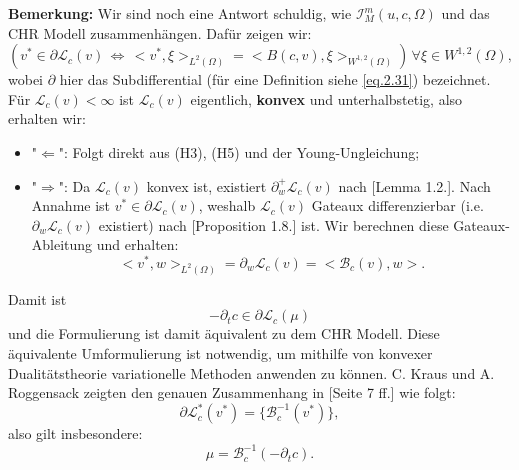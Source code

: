 \textbf{Bemerkung:} Wir sind noch eine Antwort schuldig, wie \(\mathcal{I}_M^m(u,c,\Omega)\) und das CHR Modell zusammenhängen. Dafür zeigen wir:
\begin{equation}
    (v^* \in \partial \mathcal{L}_c(v) \, \Leftrightarrow \, <v^*,\xi>_{L^2(\Omega)} = <B(c,v),\xi>_{W^{1,2}(\Omega)}) \, \forall \xi \in W^{1,2}(\Omega),
\end{equation}
wobei \(\partial\) hier das Subdifferential (für eine Definition siehe \eqref{eq.2.31}) bezeichnet. Für \(\mathcal{L}_c(v) < \infty\) ist \(\mathcal{L}_c(v)\) eigentlich, \textbf{konvex} und unterhalbstetig, also erhalten wir:
\begin{itemize}
    \item "\(\Leftarrow\)": Folgt direkt aus (H3), (H5) und der Young-Ungleichung;
    \item "\(\Rightarrow\)": Da \(\mathcal{L}_c(v)\) konvex ist, existiert \(\partial_w^+ \mathcal{L}_c(v)\) nach \cite{phelps2009convex}[Lemma 1.2.]. Nach Annahme ist \(v^* \in \partial \mathcal{L}_c(v)\), weshalb \(\mathcal{L}_c(v)\) Gateaux differenzierbar (i.e. \(\partial_w \mathcal{L}_c(v)\) existiert) nach \cite{phelps2009convex}[Proposition 1.8.] ist. Wir berechnen diese Gateaux-Ableitung und erhalten:
    \begin{equation}
        <v^*,w>_{L^2(\Omega)} = \partial_w \mathcal{L}_c(v) = <\mathcal{B}_c(v),w>.
    \end{equation}
\end{itemize}
Damit ist
\begin{equation}
    -\partial_t c \in \partial \mathcal{L}_c(\mu)
\end{equation}
und die Formulierung ist damit äquivalent zu dem CHR Modell. Diese äquivalente Umformulierung ist notwendig, um mithilfe von konvexer Dualitätstheorie variationelle Methoden anwenden zu können. C. Kraus und A. Roggensack zeigten den genauen Zusammenhang in \cite{kraus2016existence}[Seite 7 ff.] wie folgt:
\begin{equation}
    \partial \mathcal{L}_c^*(v^*) = \{\mathcal{B}_c^{-1}(v^*)\},
\end{equation}
also gilt insbesondere:
\begin{equation}
    \mu = \mathcal{B}_c^{-1}(-\partial_t c).
\end{equation}

